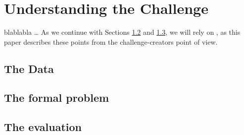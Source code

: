 \section{Understanding the Challenge}\label{ch:challenge}\raggedbottom
blablabla \ldots
As we continue with Sections \ref{sec:prob} and \ref{sec:eval}, we will 
rely on \cite{higgsPaper}, as this paper describes these points from the challenge-creators point of view.

\subsection{The Data}



\subsection{The formal problem}\label{sec:prob}



\subsection{The evaluation}\label{sec:eval}




%
\pagebreak

	{\pagebreak \thispagestyle{empty} \cleardoublepage}{\clearpage}
